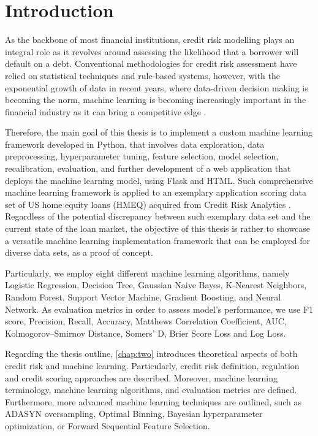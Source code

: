 \chapter{Introduction}
\label{chap:one}

As the backbone of most financial institutions, credit risk modelling plays an integral role as it revolves around assessing the likelihood that a borrower will default on a debt.
Conventional methodologies for credit risk assessment have relied on statistical techniques and rule-based systems, however, with the exponential growth of data in recent years, where data-driven decision making is becoming the norm, machine learning is becoming increasingly important in the financial industry as it can bring a competitive edge \citep{PwC2023}.


Therefore, the main goal of this thesis is to implement a custom machine learning framework developed in Python, that involves data exploration, data preprocessing, hyperparameter tuning, feature selection, model selection, recalibration, evaluation, and further development of a web application that deploys the machine learning model, using Flask and HTML.
Such comprehensive machine learning framework is applied to an exemplary application scoring data set of US home equity loans (HMEQ) acquired from Credit Risk Analytics \citep{baesens2016credit}.
Regardless of the potential discrepancy between such exemplary data set and the current state of the loan market, the objective of this thesis is rather to showcase a versatile machine learning implementation framework that can be employed for diverse data sets, as a proof of concept.



Particularly, we employ eight different machine learning algorithms, namely Logistic Regression, Decision Tree, Gaussian Naive Bayes, K-Nearest Neighbors, Random Forest, Support Vector Machine, Gradient Boosting, and Neural Network.
As evaluation metrics in order to assess model's performance, we use F1 score, Precision, Recall, Accuracy, Matthews Correlation Coefficient, AUC, Kolmogorov--Smirnov Distance, Somers' D, Brier Score Loss and Log Loss.



Regarding the thesis outline, \autoref{chap:two} introduces theoretical aspects of both credit risk and machine learning. Particularly, credit risk definition, regulation and credit scoring approaches are described. Moreover, machine learning terminology, machine learning algorithms, and evaluation metrics are defined.
Furthermore, more advanced machine learning techniques are outlined, such as ADASYN oversampling, Optimal Binning, Bayesian hyperparameter optimization, or Forward Sequential Feature Selection.


